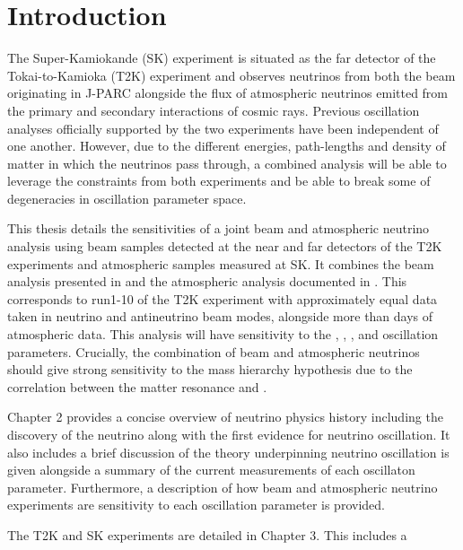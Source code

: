 \chapter{Introduction}
\label{chap:Introduction}

The Super-Kamiokande (SK) experiment is situated as the far detector of the Tokai-to-Kamioka (T2K) experiment and observes neutrinos from both the beam originating in J-PARC alongside the flux of atmospheric neutrinos emitted from the primary and secondary interactions of cosmic rays. Previous oscillation analyses officially supported by the two experiments have been independent of one another. However, due to the different energies, path-lengths and density of matter in which the neutrinos pass through, a combined analysis will be able to leverage the constraints from both experiments and be able to break some of degeneracies in oscillation parameter space.

This thesis details the sensitivities of a joint beam and atmospheric neutrino analysis using beam samples detected at the near and far detectors of the T2K experiments and atmospheric samples measured at SK. It combines the beam analysis presented in \cite{Dunne2020-uf} and the atmospheric analysis documented in \cite{Jiang2019-iw}. This corresponds to run1-10 of the T2K experiment with approximately equal data taken in neutrino and antineutrino beam modes, alongside more than  days of atmospheric data. This analysis will have sensitivity to the , , , and  oscillation parameters. Crucially, the combination of beam and atmospheric neutrinos should give strong sensitivity to the mass hierarchy hypothesis due to the correlation between the matter resonance and .

Chapter 2 provides a concise overview of neutrino physics history including the discovery of the neutrino along with the first evidence for neutrino oscillation. It also includes a brief discussion of the theory underpinning neutrino oscillation is given alongside a summary of the current measurements of each oscillaton parameter. Furthermore, a description of how beam and atmospheric neutrino experiments are sensitivity to each oscillation parameter is provided.

The T2K and SK experiments are detailed in Chapter 3. This includes a 
